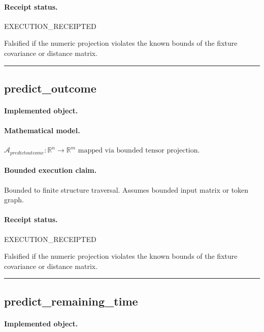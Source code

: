 \paragraph{Receipt status.} EXECUTION\_RECEIPTED
\begin{falsifier}
Falsified if the numeric projection violates the known bounds of the fixture covariance or distance matrix.
\end{falsifier}

\vspace{1em}\hrule\vspace{1em}
\subsection{predict\_outcome}
\paragraph{Implemented object.} 
\paragraph{Mathematical model.} $\mathcal{A}_{predictoutcome} : \mathbb{R}^{n} \to \mathbb{R}^{m} \text{ mapped via bounded tensor projection}.$
\paragraph{Bounded execution claim.} Bounded to finite structure traversal. Assumes bounded input matrix or token graph.
\paragraph{Receipt status.} EXECUTION\_RECEIPTED
\begin{falsifier}
Falsified if the numeric projection violates the known bounds of the fixture covariance or distance matrix.
\end{falsifier}

\vspace{1em}\hrule\vspace{1em}
\subsection{predict\_remaining\_time}
\paragraph{Implemented object.} 
